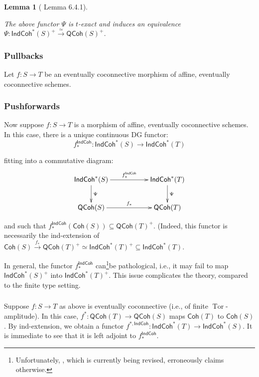 \documentclass[reqno,11pt]{amsart}
\numberwithin{equation}{subsection}
\newtheorem{lem}[thm]{Lemma}
\theoremstyle{remark}
\newcommand{\xar}[1]{\xrightarrow{#1}}
\newcommand{\rar}[1]{\xar{#1}}
\newcommand{\isom}{\rar{\simeq}}
\newcommand{\on}{\operatorname}
\newcommand{\Tor}{\on{Tor}}
\newcommand{\Coh}{\mathsf{Coh}}
\newcommand{\IndCoh}{\mathsf{IndCoh}}
\newcommand{\QCoh}{\mathsf{QCoh}}
\renewcommand{\subset}{\subseteq}
\begin{document}
\begin{lem}[\cite{methods} Lemma 6.4.1]\label{l:psi-affine}

The above functor $\Psi$ is $t$-exact and induces an equivalence 
$\Psi:\IndCoh^*(S)^+ \isom \QCoh(S)^+$.

\end{lem}

\subsubsection{Pullbacks}

Let $f:S \to T$ be an eventually coconnective morphism of affine, eventually
coconnective schemes.


\subsubsection{Pushforwards}

Now suppose $f:S \to T$ is a morphism of affine, eventually coconnective schemes.
In this case, there is a unique continuous DG functor:
%
\[
f_*^{\IndCoh}:\IndCoh^*(S) \to \IndCoh^*(T)
\]

\noindent fitting into a commutative diagram:
%
\[
\xymatrix{
\IndCoh^*(S) \ar[rr]^{f_*^{\IndCoh}} \ar[d]^{\Psi} &&  \IndCoh^*(T)\ar[d]^{\Psi} \\
\QCoh(S) \ar[rr]^{f_*} && \QCoh(T)
}
\]

\noindent and such that $f_*^{\IndCoh}(\Coh(S)) \subset \QCoh(T)^+$.
(Indeed, this functor is necessarily the ind-extension of 
$\Coh(S) \xar{f_*} \QCoh(T)^+ \simeq \IndCoh^*(T)^+ \subset \IndCoh^*(T)$.

In general, the functor $f_*^{\IndCoh}$ can\footnote{Unfortunately, \cite{methods}, which
is currently being revised, erroneously claims otherwise.}be pathological, i.e., it may fail to map $\IndCoh^*(S)^+$ into $\IndCoh^*(T)^+$.
This issue complicates the theory, compared to the finite type setting. 

\subsubsection{}

Suppose $f:S \to T$ as above is eventually coconnective (i.e., of finite
$\Tor$-amplitude). In this case,
$f^*:\QCoh(T) \to \QCoh(S)$ maps $\Coh(T)$ to $\Coh(S)$. By ind-extension,
we obtain a functor $f^{*,\IndCoh}:\IndCoh^*(T) \to \IndCoh^*(S)$.
It is immediate to see that it is left adjoint to $f_*^{\IndCoh}$.
\end{document}
